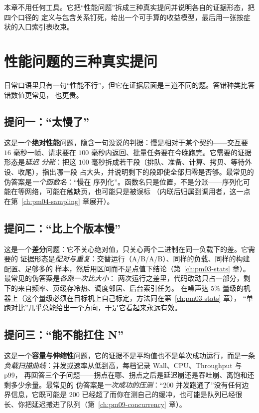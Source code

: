 \documentclass[12pt,a4paper,fontset=fandol]{ctexbook}
\newcommand{\Lang}[1]{\textsf{#1}}
\newcommand{\MWall}{\Lang{Wall}}
\newcommand{\MCpu}{\Lang{CPU}}
\newcommand{\MThr}{\Lang{Throughput}}
\newcommand{\Mx}[1]{\textsf{#1}}
\begin{document}
本章不用任何工具。它把``性能问题''拆成三种真实提问并说明各自的证据形态，把四个口径的
定义与包含关系钉死，给出一个可手算的收益模型，最后用一张按症状的入口索引表收束。

\section{性能问题的三种真实提问}
\label{sec:pm01-question}

日常口语里只有一句``性能不行''，但它在证据层面是三道不同的题。答错种类比答错数值更常见，
也更贵。

\subsection*{提问一：``太慢了''}

这是一个\textbf{绝对性能}问题，隐含一句没说的判据：慢是相对于某个契约——交互要 $16$
毫秒一帧、请求要在 $100$ 毫秒内返回、批量任务要在今晚跑完。它需要的证据形态是\emph{延迟
分账}：把这 $100$ 毫秒拆成若干段（排队、准备、计算、拷贝、等待外设、收尾），指出哪一段
占大头，并说明剩下的段即使全部归零是否够。最常见的伪答案是\emph{一个函数名}：``慢在
序列化''。函数名只是位置，不是分账——序列化可能在等网络，可能在触缺页，也可能只是被误标
（内联后归属到调用者，这一点在第~\ref{ch:pm04-sampling} 章展开）。

\subsection*{提问二：``比上个版本慢''}

这是一个\textbf{差分}问题：它不关心绝对值，只关心两个二进制在同一负载下的差。它需要的
证据形态是\emph{配对与重复}：交替运行（A/B/A/B）、同样的负载、同样的构建配置、足够多的
样本，然后用区间而不是点值下结论（第~\ref{ch:pm03-stats} 章）。最常见的伪答案是\emph{各跑一次比大小}：
两次运行之差里，代码改动只占一部分，剩下的来自频率、页缓存冷热、调度邻居、后台索引任务。
在噪声达 $5\%$ 量级的机器上（这个量级必须在目标机上自己标定，方法同在第~\ref{ch:pm03-stats} 章），
``单跑对比''几乎总能给出一个方向，于是它看起来永远有效。

\subsection*{提问三：``能不能扛住 N''}

这是一个\textbf{容量与伸缩性}问题，它的证据不是平均值也不是单次成功运行，而是一条
\emph{负载扫描曲线}：并发或速率从低到高，每档记录 \MWall、\MCpu、\MThr{} 与 \Mx{p99}，
再回答三个子问题——拐点在哪、拐点之后是延迟崩还是吞吐崩、离饱和还剩多少余量。最常见的
伪答案是\emph{一次成功的压测}：``$200$ 并发跑通了''没有任何边界信息，它既可能是 $200$
已经超了而你在测自己的缓冲，也可能是队列已经很长、你把延迟搬进了队列（第~\ref{ch:pm09-concurrency} 章）。
\end{document}
